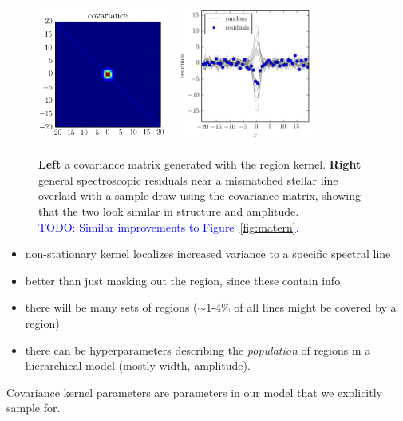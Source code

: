\documentclass[iop,floatfix]{emulateapj}
\newcommand{\todo}[1]{ \textcolor{Blue}{\\TODO: #1}}
\begin{document}
\begin{figure}[!htb]
\begin{center}
\includegraphics[width=0.4\textwidth]{figs/matrix_region_covariance.png}
\includegraphics[width=0.4\textwidth]{figs/random_draw.png}
\caption{\textbf{Left} a covariance matrix generated with the region kernel.
\textbf{Right} general spectroscopic residuals near a mismatched stellar line
 overlaid with a sample draw using the covariance matrix, showing that the two
 look similar in structure and amplitude. 
\protect \todo{Similar improvements to
  Figure~\ref{fig:matern}.}}
\label{fig:region}
\end{center}
\end{figure}

\begin{itemize}
  \item non-stationary kernel localizes increased variance to a specific
    spectral line
  \item better than just masking out the region, since these contain info
  \item there will be many sets of regions ($\sim$1-4\% of all lines might be
    covered by a region)
  \item there can be hyperparameters describing the \emph{population} of
    regions in a hierarchical model (mostly width, amplitude).
\end{itemize}

Covariance kernel parameters are parameters in our model that we explicitly
 sample for. 
\end{document}
